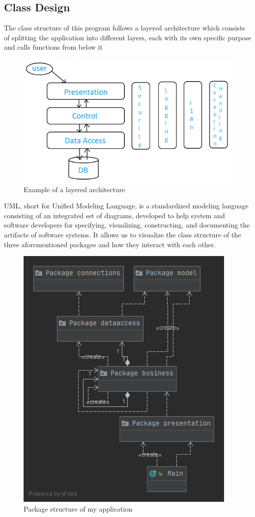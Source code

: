\documentclass[10pt,a4paper]{article}
\begin{document}
\subsection{Class Design}
The class structure of this program follows a layered architecture which consists of splitting the application into different layers, each with its own specific purpose and calls functions from below it
\begin{figure}[!htb]
\centering
\includegraphics[scale=0.40]{layers.png}
\caption{Example of a layered architecture}
\end{figure}
\FloatBarrier
UML, short for Unified Modeling Language, is a standardized modeling language consisting of an integrated set of diagrams, developed to help system and software developers for specifying, visualizing, constructing, and documenting the artifacts of software systems. It allows us to visualize the class structure of the three aforementioned packages and how they interact with each other.\par
\begin{figure}[!htb]
\centering
\includegraphics[scale=0.40]{package_struct.png}
\caption{Package structure of my application}
\end{figure}
\end{document}
